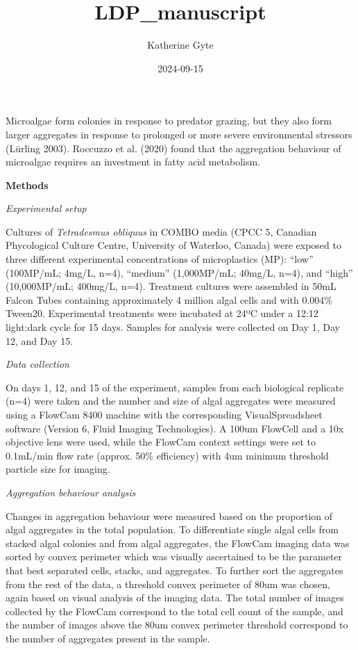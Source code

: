 \documentclass[
]{article}
\title{LDP\_manuscript}
\author{Katherine Gyte}
\date{2024-09-15}
\begin{document}
\maketitle

Microalgae form colonies in response to predator grazing, but they also
form larger aggregates in response to prolonged or more severe
environmental stressors (Lürling 2003). Roccuzzo et al. (2020) found
that the aggregation behaviour of microalgae requires an investment in
fatty acid metabolism.

\textbf{Methods}

\emph{Experimental setup}

Cultures of \emph{Tetradesmus obliquus} in COMBO media (CPCC 5, Canadian
Phycological Culture Centre, University of Waterloo, Canada) were
exposed to three different experimental concentrations of microplastics
(MP): ``low'' (100MP/mL; 4mg/L, n=4), ``medium'' (1,000MP/mL; 40mg/L,
n=4), and ``high'' (10,000MP/mL; 400mg/L, n=4). Treatment cultures were
assembled in 50mL Falcon Tubes containing approximately 4 million algal
cells and with 0.004\% Tween20. Experimental treatments were incubated
at 24ºC under a 12:12 light:dark cycle for 15 days. Samples for analysis
were collected on Day 1, Day 12, and Day 15.

\emph{Data collection}

On days 1, 12, and 15 of the experiment, samples from each biological
replicate (n=4) were taken and the number and size of algal aggregates
were measured using a FlowCam 8400 machine with the corresponding
VisualSpreadsheet software (Version 6, Fluid Imaging Technologies). A
100um FlowCell and a 10x objective lens were used, while the FlowCam
context settings were set to 0.1mL/min flow rate (approx. 50\%
efficiency) with 4um minimum threshold particle size for imaging.

\emph{Aggregation behaviour analysis}

Changes in aggregation behaviour were measured based on the proportion
of algal aggregates in the total population. To differentiate single
algal cells from stacked algal colonies and from algal aggregates, the
FlowCam imaging data was sorted by convex perimeter which was visually
ascertained to be the parameter that best separated cells, stacks, and
aggregates. To further sort the aggregates from the rest of the data, a
threshold convex perimeter of 80um was chosen, again based on visual
analysis of the imaging data. The total number of images collected by
the FlowCam correspond to the total cell count of the sample, and the
number of images above the 80um convex perimeter threshold correspond to
the number of aggregates present in the sample.
\end{document}
